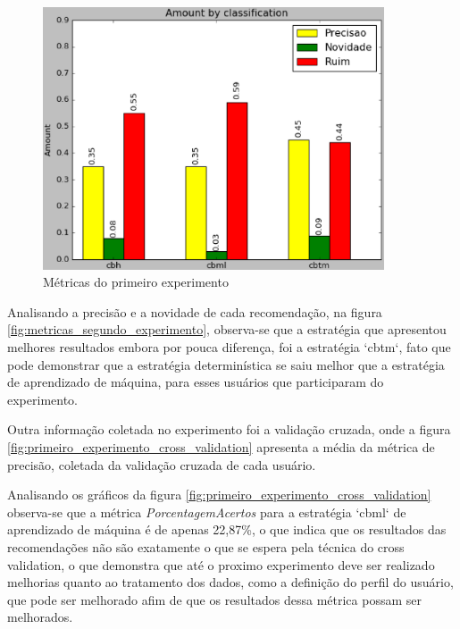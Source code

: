\begin{figure}[h]
  \centering
  \includegraphics[width=0.9\textwidth]{figuras/metricas_primeiro_experimento.eps}
  \caption{Métricas do primeiro experimento}
  \label{fig:metricas_primeiro_experimento}
\end{figure}

Analisando a precisão e a novidade de cada recomendação, na figura
\ref{fig:metricas_segundo_experimento}, observa-se que a estratégia que
apresentou melhores resultados embora por pouca diferença, foi a estratégia
`cbtm`, fato que pode demonstrar que a estratégia determinística se saiu melhor
que a estratégia de aprendizado de máquina, para esses usuários que
participaram do experimento.

Outra informação coletada no experimento foi a validação cruzada, onde a
figura \ref{fig:primeiro_experimento_cross_validation} apresenta a média da
métrica de precisão, coletada da validação cruzada de cada usuário.

Analisando os gráficos da figura \ref{fig:primeiro_experimento_cross_validation}
observa-se que a métrica \textit{PorcentagemAcertos} para a estratégia `cbml`
de aprendizado de máquina é de apenas 22,87\%, o que indica que os resultados
das recomendações não são exatamente o que se espera pela técnica do cross
validation, o que demonstra que até o proximo experimento deve ser realizado
melhorias quanto ao tratamento dos dados, como a definição do perfil do
usuário, que pode ser melhorado afim de que os resultados dessa métrica possam
ser melhorados.

\pagebreak

